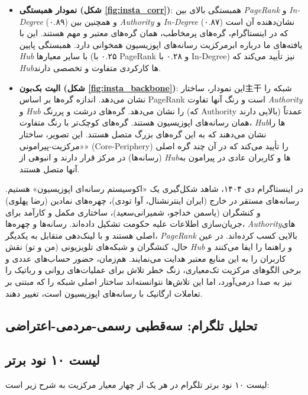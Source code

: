 \documentclass{article}
\begin{document}
	\begin{itemize}
		\item \textbf{نمودار همبستگی (شکل \ref{fig:insta_corr})}: همبستگی بالای بین \textit{PageRank} و \textit{In-Degree} (۰.۸۹) و همچنین بین \textit{Authority} و \textit{In-Degree} (۰.۸۷) نشان‌دهنده آن است که در اینستاگرام، گره‌های پرمخاطب، همان گره‌های معتبر و مهم هستند. این با یافته‌های ما درباره ابرمرکزیت رسانه‌های اپوزیسیون همخوانی دارد. همبستگی پایین \textit{Hub} با سایر معیارها (۰.۲۵ با PageRank و ۰.۲۸ با In-Degree) نیز تأیید می‌کند که \textit{Hub}ها کارکردی متفاوت و تخصصی دارند.
		\item \textbf{الیت بک‌بون (شکل \ref{fig:insta_backbone})}: این نمودار، ساختار主干 شبکه را نشان می‌دهد. اندازه گره‌ها بر اساس PageRank است و رنگ آنها تفاوت \textit{Authority} و \textit{Hub} را نشان می‌دهد. گره‌های درشت و پررنگ (که Authority بالایی دارند) عمدتاً همان رسانه‌های اپوزیسیون هستند. گره‌های کوچک‌تر با رنگ متفاوت، \textit{Hub}ها را نشان می‌دهند که به این گره‌های بزرگ متصل هستند. این تصویر، ساختار «مرکزیت-پیرامونی» (Core-Periphery) را تأیید می‌کند که در آن چند گره اصلی (رسانه‌ها) در مرکز قرار دارند و انبوهی از \textit{Hub}ها و کاربران عادی در پیرامون به آنها متصل هستند.
	\end{itemize}
	در اینستاگرام دی ۱۴۰۴، شاهد شکل‌گیری یک «اکوسیستم رسانه‌ای اپوزیسیون» هستیم. رسانه‌های مستقر در خارج (ایران اینترنشنال، آوا تودی)، چهره‌های نمادین (رضا پهلوی) و کنشگران (یاسمن خداجو، شمیرانی‌سعید)، ساختاری مکمل و کارآمد برای جریان‌سازی اطلاعات علیه حکومت تشکیل داده‌اند. رسانه‌ها و چهره‌ها، \textit{Authority}های اصلی هستند و با لینک‌دهی متقابل به یکدیگر، \textit{PageRank} بالایی کسب کرده‌اند. در عین حال، کنشگران و شبکه‌های تلویزیونی (من و تو) نقش \textit{Hub} و راهنما را ایفا می‌کنند و کاربران را به این منابع معتبر هدایت می‌نمایند. هم‌زمان، حضور حساب‌های عددی و برخی الگوهای مرکزیت تک‌معیاری، زنگ خطر تلاش برای عملیات‌های روانی و رباتیک را نیز به صدا درمی‌آورد، اما این تلاش‌ها نتوانسته‌اند ساختار اصلی شبکه را که مبتنی بر تعاملات ارگانیک با رسانه‌های اپوزیسیون است، تغییر دهند.
	\subsection{تحلیل تلگرام: سه‌قطبی رسمی-مردمی-اعتراضی}
	
	\subsection{لیست ۱۰ نود برتر}
	لیست ۱۰ نود برتر تلگرام در هر یک از چهار معیار مرکزیت به شرح زیر است:
	
\end{document}

